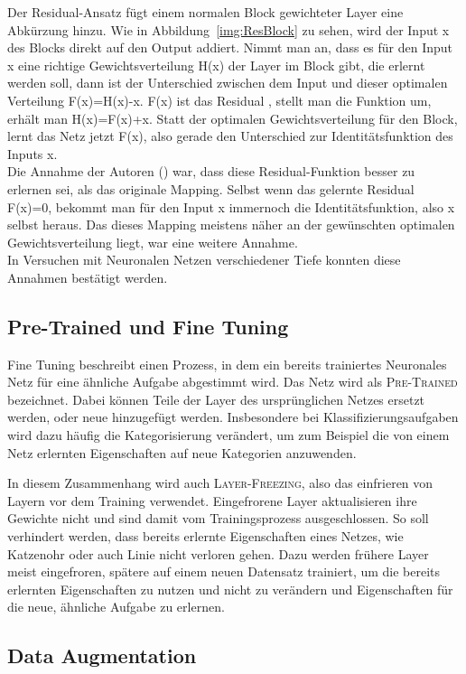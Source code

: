Der Residual-Ansatz fügt einem normalen Block gewichteter Layer eine Abkürzung hinzu. Wie in Abbildung~\ref{img:ResBlock} zu sehen, wird der Input x des Blocks direkt auf den Output addiert. Nimmt man an, dass es für den Input x eine richtige Gewichtsverteilung H(x) der Layer im Block gibt, die erlernt werden soll, dann ist der Unterschied zwischen dem Input und dieser optimalen Verteilung F(x)=H(x)-x. F(x) ist das \glqq Residual \grqq{}, stellt man die Funktion um, erhält man H(x)=F(x)+x. Statt der optimalen Gewichtsverteilung für den Block, lernt das Netz jetzt F(x), also gerade den Unterschied zur Identitätsfunktion des Inputs x.\\
Die Annahme der Autoren (\cite{DBLP:journals/corr/HeZRS15}) war, dass diese Residual-Funktion besser zu erlernen sei, als das originale Mapping. Selbst wenn das gelernte Residual F(x)=0, bekommt man für den Input x immernoch die Identitätsfunktion, also x selbst heraus. Das dieses Mapping meistens näher an der gewünschten optimalen Gewichtsverteilung liegt, war eine weitere Annahme.\\
In Versuchen mit Neuronalen Netzen verschiedener Tiefe konnten diese Annahmen bestätigt werden. 


\subsection{Pre-Trained und Fine Tuning}
Fine Tuning beschreibt einen Prozess, in dem ein bereits trainiertes Neuronales Netz für eine ähnliche Aufgabe abgestimmt wird. Das Netz wird als \textsc{Pre-Trained} bezeichnet. Dabei können Teile der Layer des ursprünglichen Netzes ersetzt werden, oder neue hinzugefügt werden. Insbesondere bei Klassifizierungsaufgaben wird dazu häufig die Kategorisierung verändert, um zum Beispiel die von einem Netz erlernten Eigenschaften auf neue Kategorien anzuwenden.

In diesem Zusammenhang wird auch \textsc{Layer-Freezing}, also das einfrieren von Layern vor dem Training verwendet. Eingefrorene Layer aktualisieren ihre Gewichte nicht und sind damit vom Trainingsprozess ausgeschlossen. So soll verhindert werden, dass bereits erlernte Eigenschaften eines Netzes, wie \glqq Katzenohr \grqq{} oder auch \glqq Linie \grqq{} nicht verloren gehen. Dazu werden frühere Layer meist eingefroren, spätere auf einem neuen Datensatz trainiert, um die bereits erlernten Eigenschaften zu nutzen und nicht zu verändern und Eigenschaften für die neue, ähnliche Aufgabe zu erlernen.


\subsection{Data Augmentation}

